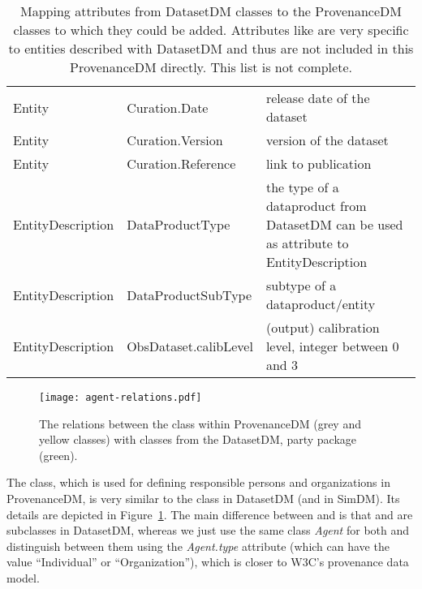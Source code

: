 \begin{table}[ht]
\small
{}\textwidth
\begin{tabulary}{1.0\textwidth}{@{}Llp{5cm}@{}}
\toprule
{} &  & \\
\midrule
Entity           & Curation.Date          & release date of the dataset\\
Entity           & Curation.Version       & version of the dataset\\
Entity           & Curation.Reference     & link to publication\\
EntityDescription & DataProductType & the type of a dataproduct from DatasetDM can be used as attribute to EntityDescription\\
EntityDescription & DataProductSubType    & subtype of a \mbox{dataproduct}/entity\\
EntityDescription & ObsDataset.calibLevel & (output) calibration level, integer between 0 and 3\\
\bottomrule
\end{tabulary}
\caption[Mapping attributes from DatasetDM classes to the ProvenanceDM classes]{Mapping attributes from DatasetDM classes to the ProvenanceDM classes to which they could be added. Attributes like  are very specific to entities described with DatasetDM and thus are not included in this ProvenanceDM directly. This list is not complete.}
\label{tab:datasetmapping2}
\end{table}


\begin{figure}[ht]
\centering
\texttt{[image: agent-relations.pdf]}
\caption[Agent in ProvenanceDM and Party in DatasetDM]{The relations between the  class within ProvenanceDM 
(grey and yellow classes) with classes from the DatasetDM, party package (green).}
\label{fig:agent-relations}
\end{figure}

The  class, which is used for defining responsible persons and 
organizations in ProvenanceDM, is very similar to the  class in DatasetDM (and in SimDM). Its details are depicted in Figure~\ref{fig:agent-relations}.
The main difference between  and  is that  and  are subclasses in DatasetDM, whereas we just use the same class \emph{Agent} for both and distinguish between them using the \emph{Agent.type} attribute (which can have the value ``Individual'' or ``Organization''), which is closer to W3C's provenance data model.


